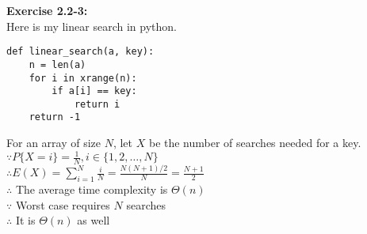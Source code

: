 \documentclass{article}
\begin{document}
\noindent
\textbf{Exercise 2.2-3:}\\
\noindent
Here is my linear search in python.
\begin{verbatim}
def linear_search(a, key):
    n = len(a)
    for i in xrange(n):
        if a[i] == key:
            return i
    return -1
\end{verbatim}
\begin{spacing}{2.0}
\noindent
For an array of size $N$, let $X$ be the number of searches needed for a key.\\
$\because P\{X = i\} = \frac{1}{N}, i \in \{1, 2, \ldots, N\}$\\
$\therefore E(X) = \sum \limits _ {i = 1} ^ {N} \frac{i}{N} = \frac {N(N + 1) / 2} {N} = \frac{N + 1}{2}$\\
$\therefore$ The average time complexity is $\Theta(n)$\\
$\because$ Worst case requires $N$ searches\\
$\therefore$ It is $\Theta(n)$ as well\\
\end{spacing}
\end{document}
